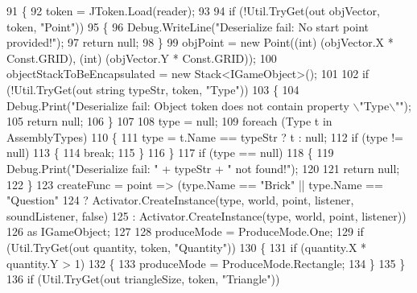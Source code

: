 \begin{DoxyCode}
91         \{
92             token = JToken.Load(reader);
93 
94             \textcolor{keywordflow}{if} (!Util.TryGet(out objVector, token, \textcolor{stringliteral}{"Point"}))
95             \{
96                 Debug.WriteLine(\textcolor{stringliteral}{"Deserialize fail: No start point provided!"});
97                 \textcolor{keywordflow}{return} null;
98             \}
99             objPoint = \textcolor{keyword}{new} Point((\textcolor{keywordtype}{int}) (objVector.X * Const.GRID), (\textcolor{keywordtype}{int}) (objVector.Y * Const.GRID));
100             objectStackToBeEncapsulated = \textcolor{keyword}{new} Stack<IGameObject>();
101 
102             \textcolor{keywordflow}{if} (!Util.TryGet(out \textcolor{keywordtype}{string} typeStr, token, \textcolor{stringliteral}{"Type"}))
103             \{
104                 Debug.Print(\textcolor{stringliteral}{"Deserialize fail: Object token does not contain property \(\backslash\)"Type\(\backslash\)""});
105                 \textcolor{keywordflow}{return} null;
106             \}
107 
108             type = null;
109             \textcolor{keywordflow}{foreach} (Type t \textcolor{keywordflow}{in} AssemblyTypes)
110             \{
111                 type = t.Name == typeStr ? t : null;
112                 \textcolor{keywordflow}{if} (type != null)
113                 \{
114                     \textcolor{keywordflow}{break};
115                 \}
116             \}
117             \textcolor{keywordflow}{if} (type == null)
118             \{
119                 Debug.Print(\textcolor{stringliteral}{"Deserialize fail: "} + typeStr + \textcolor{stringliteral}{" not found!"});
120 
121                 \textcolor{keywordflow}{return} null;
122             \}
123             createFunc = point => (type.Name == \textcolor{stringliteral}{"Brick"} || type.Name == \textcolor{stringliteral}{"Question"}
124                     ? Activator.CreateInstance(type, world, point, listener, 
      soundListener, \textcolor{keyword}{false})
125                     : Activator.CreateInstance(type, world, point, listener))
126                 as IGameObject;
127 
128             produceMode = ProduceMode.One;
129             \textcolor{keywordflow}{if} (Util.TryGet(out quantity, token, \textcolor{stringliteral}{"Quantity"}))
130             \{
131                 \textcolor{keywordflow}{if} (quantity.X * quantity.Y > 1)
132                 \{
133                     produceMode = ProduceMode.Rectangle;
134                 \}
135             \}
136             \textcolor{keywordflow}{if} (Util.TryGet(out triangleSize, token, \textcolor{stringliteral}{"Triangle"}))

\end{DoxyCode}
